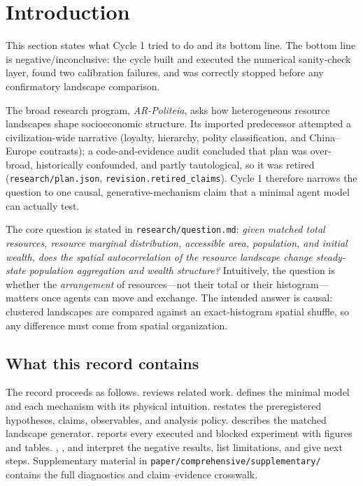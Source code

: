 \documentclass[11pt,a4paper]{article}
\newcommand{\code}[1]{\texttt{#1}}
\begin{document}
\tableofcontents

\section{Introduction}
\label{sec:intro}

This section states what Cycle 1 tried to do and its bottom line. The bottom
line is negative/inconclusive: the cycle built and executed the numerical
sanity-check layer, found two calibration failures, and was correctly stopped
before any confirmatory landscape comparison.

The broad research program, \emph{AR-Politeia}, asks how heterogeneous resource
landscapes shape socioeconomic structure. Its imported predecessor attempted a
civilization-wide narrative (loyalty, hierarchy, polity classification, and
China--Europe contrasts); a code-and-evidence audit concluded that plan was
over-broad, historically confounded, and partly tautological, so it was retired
(\code{research/plan.json}, \code{revision.retired\_claims}). Cycle 1 therefore
narrows the question to one causal, generative-mechanism claim that a minimal
agent model can actually test.

The core question is stated in \code{research/question.md}: \emph{given matched
total resources, resource marginal distribution, accessible area, population,
and initial wealth, does the spatial autocorrelation of the resource landscape
change steady-state population aggregation and wealth structure?} Intuitively,
the question is whether the \emph{arrangement} of resources---not their total or
their histogram---matters once agents can move and exchange. The intended
answer is causal: clustered landscapes are compared against an exact-histogram
spatial shuffle, so any difference must come from spatial organization.

\subsection{What this record contains}

The record proceeds as follows.  reviews related work.
 defines the minimal model and each mechanism with its physical
intuition.  restates the preregistered hypotheses, claims,
observables, and analysis policy.  describes the matched
landscape generator.  reports every executed and blocked
experiment with figures and tables. , ,
and  interpret the negative results, list limitations, and
give next steps. Supplementary material in
\code{paper/comprehensive/supplementary/} contains the full diagnostics and
claim--evidence crosswalk.
\end{document}
